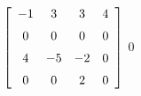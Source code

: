 {$\left[ \begin {array}{cccc} -1&3&3&4\\\noalign{\medskip}0&0&0&0
\\\noalign{\medskip}4&-5&-2&0\\\noalign{\medskip}0&0&2&0\end {array} \right]$} 
{$0$}



  

